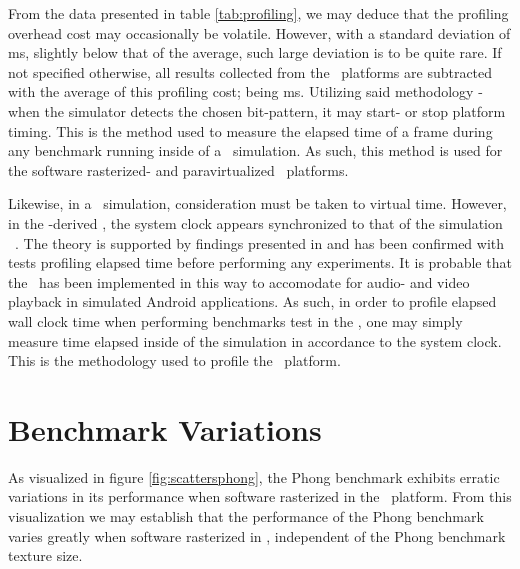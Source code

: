 

From the data presented in table \ref{tab:profiling}, we may deduce that the profiling overhead cost may occasionally be volatile.
However, with a standard deviation of  ms, slightly below that of the average, such large deviation is to be quite rare.
If not specified otherwise, all results collected from the \dvttermsimics\ platforms are subtracted with the average of this profiling cost; being  ms.
Utilizing said methodology - when the simulator detects the chosen bit-pattern, it may start- or stop platform timing.
This is the method used to measure the elapsed time of a frame during any benchmark running inside of a \dvttermsimics\ simulation.
As such, this method is used for the software rasterized- and paravirtualized \dvttermsimics\ platforms. 

Likewise, in a \dvttermqemu\ simulation, consideration must be taken to virtual time.
However, in the \dvttermqemu -derived \dvttermandroidemulator , the system clock appears synchronized to that of the simulation \dvttermhost ~.
The theory is supported by findings presented in  and has been confirmed with tests profiling elapsed time before performing any experiments.
It is probable that the \dvttermandroidemulator\ has been implemented in this way to accomodate for audio- and video playback in simulated Android applications.
As such, in order to profile elapsed wall clock time when performing benchmarks test in the \dvttermandroidemulator , one may simply measure time elapsed inside of the simulation in accordance to the system clock.
This is the methodology used to profile the \dvttermqemu\ platform.

\section{Benchmark Variations}
\label{sec:threatstovalidity_benchmarkvariations}
As visualized in figure \ref{fig:scattersphong}, the Phong benchmark exhibits erratic variations in its performance when software rasterized in the \dvttermsimics\ platform.
From this visualization we may establish that the performance of the Phong benchmark varies greatly when software rasterized in \dvttermsimics , independent of the Phong benchmark texture size.

